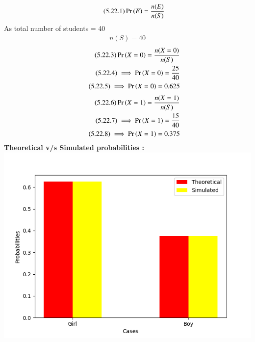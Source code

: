 \documentclass[journal,12pt,twocolumn]{IEEEtran}
\begin{document}
\begin{align}
    \tag{5.22.1}
    \Pr\left(E\right) = \frac{n(E)}{n(S)}
\end{align}
As total number of students = 40
\begin{align}
    \tag{5.22.2}
    n(S) = 40  
\end{align}
\begin{align}
    \tag{5.22.3}
    \Pr\left(X=0\right) = \frac{n(X=0)}{n(S)}\\
    \tag{5.22.4}
    \implies \Pr\left(X=0\right) = \frac{25}{40}\\
    \tag{5.22.5}
    \implies \Pr\left(X=0\right) = 0.625
\end{align}
\begin{align}
    \tag{5.22.6}
    \Pr\left(X=1\right) = \frac{n(X=1)}{n(S)}\\
    \tag{5.22.7}
    \implies \Pr\left(X=1\right) = \frac{15}{40}\\
    \tag{5.22.8}
    \implies \Pr\left(X=1\right) = 0.375
\end{align}
\textbf{Theoretical v/s Simulated probabilities :}
\includegraphics[width=\linewidth]{Figure/Plot.png}
\end{document}
